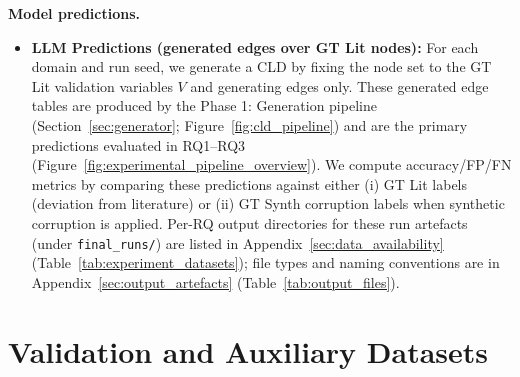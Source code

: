 \noindent\textbf{Model predictions.}
\begin{itemize}[noitemsep]
    \item \textbf{LLM Predictions (generated edges over GT Lit nodes):} For each domain and run seed, we generate a CLD by fixing the node set to the GT Lit validation variables \(V\) and generating edges only. These generated edge tables are produced by the Phase 1: Generation pipeline (Section~\ref{sec:generator}; Figure~\ref{fig:cld_pipeline}) and are the primary predictions evaluated in RQ1--RQ3 (Figure~\ref{fig:experimental_pipeline_overview}). We compute accuracy/FP/FN metrics by comparing these predictions against either (i) GT Lit labels (deviation from literature) or (ii) GT Synth corruption labels when synthetic corruption is applied. Per-RQ output directories for these run artefacts (under \texttt{final\_runs/}) are listed in Appendix~\ref{sec:data_availability} (Table~\ref{tab:experiment_datasets}); file types and naming conventions are in Appendix~\ref{sec:output_artefacts} (Table~\ref{tab:output_files}).
\end{itemize}

\section{Validation and Auxiliary Datasets}
\label{sec:aux_datasets}

